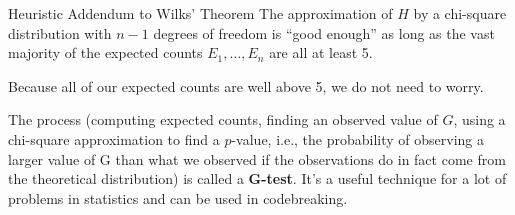 \documentclass[letterpaper]{article}
\begin{document}
\begin{theorem}{Heuristic Addendum to Wilks' Theorem}{}
    The approximation of $H$ by a chi-square distribution with $n - 1$ degrees of freedom is ``good enough'' as long as the vast majority of the expected counts $E_1, \hdots, E_n$ are all at least 5.
\end{theorem}
Because all of our expected counts are well above 5, we do not need to worry. 

\bigskip 

The process (computing expected counts, finding an observed value of $G$, using a chi-square approximation to find a $p$-value, i.e., the probability of observing a larger value of G than what we observed if the observations do in fact come from the theoretical distribution) is called a \textbf{G-test}. It's a useful technique for a lot of problems in statistics and can be used in codebreaking. 
\end{document}
